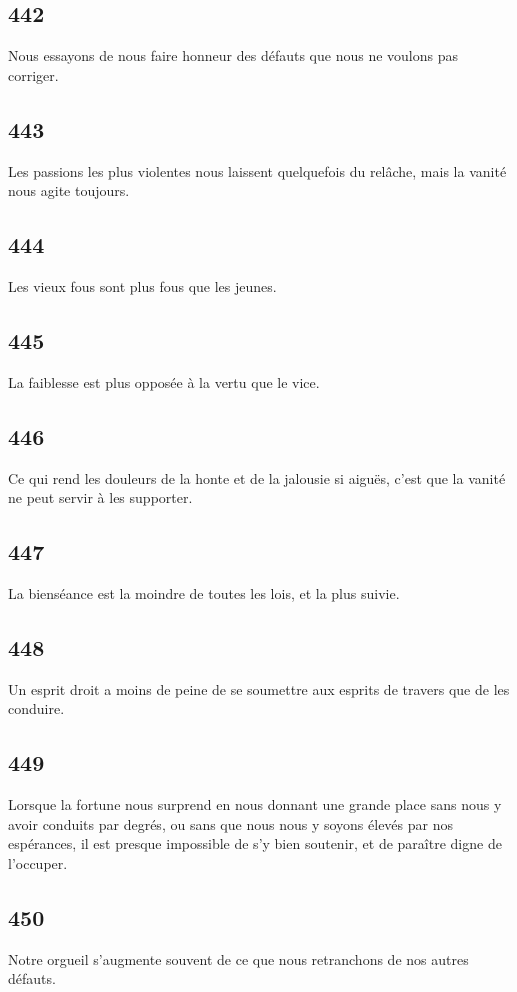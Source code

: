 \documentclass[french,twoside]{book} %
\begin{document}
\subsection[{442}]{ \textsc{442} }
\noindent Nous essayons de nous faire honneur des défauts que nous ne voulons pas corriger.
\subsection[{443}]{ \textsc{443} }
\noindent Les passions les plus violentes nous laissent quelquefois du relâche, mais la vanité nous agite toujours.
\subsection[{444}]{ \textsc{444} }
\noindent Les vieux fous sont plus fous que les jeunes.
\subsection[{445}]{ \textsc{445} }
\noindent La faiblesse est plus opposée à la vertu que le vice.
\subsection[{446}]{ \textsc{446} }
\noindent Ce qui rend les douleurs de la honte et de la jalousie si aiguës, c’est que la vanité ne peut servir à les supporter.
\subsection[{447}]{ \textsc{447} }
\noindent La bienséance est la moindre de toutes les lois, et la plus suivie.
\subsection[{448}]{ \textsc{448} }
\noindent Un esprit droit a moins de peine de se soumettre aux esprits de travers que de les conduire.
\subsection[{449}]{ \textsc{449} }
\noindent Lorsque la fortune nous surprend en nous donnant une grande place sans nous y avoir conduits par degrés, ou sans que nous nous y soyons élevés par nos espérances, il est presque impossible de s’y bien soutenir, et de paraître digne de l’occuper.
\subsection[{450}]{ \textsc{450} }
\noindent Notre orgueil s’augmente souvent de ce que nous retranchons de nos autres défauts.
\end{document}
